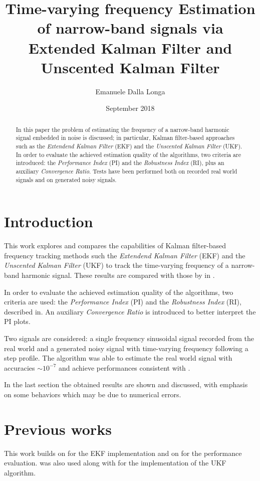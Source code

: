 \documentclass{article}
\title{Time-varying frequency Estimation of narrow-band signals via Extended Kalman Filter and Unscented Kalman Filter}
\author{Emanuele Dalla Longa}
\date{September 2018}
\begin{document}
\maketitle

\begin{abstract}
In this paper the problem of estimating the frequency of a narrow-band harmonic signal embedded in noise is discussed; in particular, Kalman filter-based approaches such as the \emph{Extendend Kalman Filter} (EKF) and the \emph{Unscented Kalman Filter} (UKF). In order to evaluate the achieved estimation quality of the algorithms, two criteria  are introduced: the \emph{Performance Index} (PI) and the \emph{Robustness Index} (RI), plus an auxiliary \emph{Convergence Ratio}. Tests have been performed both on recorded real world signals and on generated noisy signals.
\end{abstract}

\section{Introduction}
This work explores and compares the capabilities of Kalman filter-based frequency tracking methods such the \emph{Extendend Kalman Filter} (EKF) and the \emph{Unscented Kalman Filter} (UKF) to track the time-varying frequency of a narrow-band harmonic signal. These results are compared with those by \citeauthor{UKF} in \cite{UKF}. 

In order to evaluate the achieved estimation quality of the algorithms, two criteria are used: the \emph{Performance Index} (PI) and the \emph{Robustness Index} (RI), described in\cite{UKF}. An auxiliary \emph{Convergence Ratio} is introduced to better interpret the PI plots.

Two signals are considered: a single frequency sinusoidal signal recorded from the real world and a generated noisy signal with time-varying frequency following a step profile. The algorithm was able to estimate the real world signal with accuracies $\sim 10^{-7}$ and achieve performances consistent with \cite{UKF}.

In the last section the obtained results are shown and discussed, with emphasis on some behaviors which may be due to numerical errors.

\section{Previous works}
This work builds on \cite{EKF} for the EKF implementation and on \cite{UKF} for the performance evaluation. \cite{UKF} was also used along with \cite{ukftutorial} for the implementation of the UKF algorithm.
\end{document}
